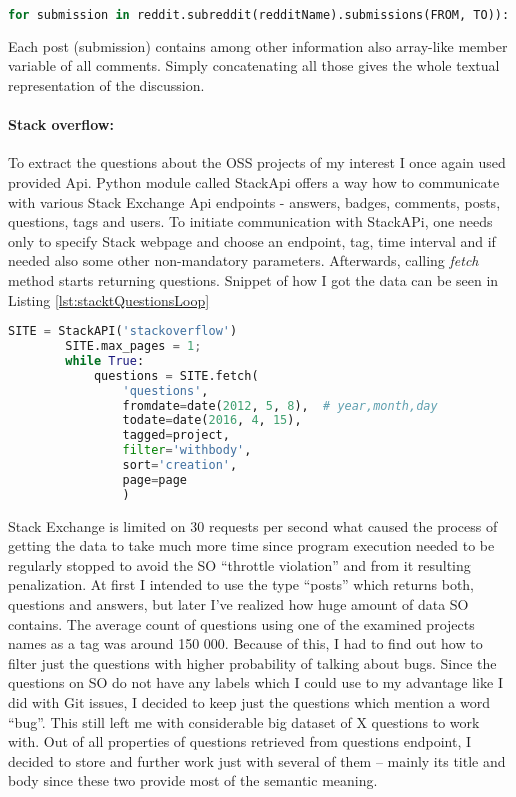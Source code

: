 \begin{lstlisting}[caption={Getting posts from subreddit},label={lst:redditSubmissionsLoop},language=Python]
for submission in reddit.subreddit(redditName).submissions(FROM, TO)):
\end{lstlisting}

Each post (submission) contains among other information also array-like member variable of all comments. Simply concatenating all those gives the whole textual representation of the discussion.


\paragraph{Stack overflow:}
To extract the questions about the OSS projects of my interest I once again used provided Api. Python module called StackApi offers a way how to communicate with various Stack Exchange Api endpoints - answers, badges, comments, posts, questions, tags and users. To initiate communication with StackAPi, one needs only to specify Stack webpage and choose an endpoint, tag, time interval and if needed also some other non-mandatory parameters. Afterwards, calling \textit{fetch} method starts returning questions. Snippet of how I got the data can be seen in Listing \ref{lst:stacktQuestionsLoop}

\begin{lstlisting}[caption={Getting Stackoverflow questions with StackApi},label={lst:stacktQuestionsLoop},language=Python]
	SITE = StackAPI('stackoverflow')
    	SITE.max_pages = 1;
    	while True:
    		questions = SITE.fetch(
    			'questions',
    			fromdate=date(2012, 5, 8),  # year,month,day
        		todate=date(2016, 4, 15),
        		tagged=project,
        		filter='withbody',
        		sort='creation',
        		page=page
                )
\end{lstlisting}

Stack Exchange is limited on 30 requests per second what caused the process of getting the data to take much more time since program execution needed to be regularly stopped to avoid the SO “throttle violation” and from it resulting penalization. At first I intended to use the type “posts” which returns both, questions and answers, but later I've realized how huge amount of data SO contains.  The average count of questions using one of the examined projects names as a tag was around 150 000. Because of this, I had to find out how to filter just the questions with higher probability of talking about bugs. Since the questions on SO do not have any labels which I could use to my advantage like I did with Git issues, I decided to keep just the questions which mention a word “bug”. This still left me with considerable big dataset of X questions to work with. Out of all properties of questions retrieved from questions endpoint, I decided to store and further work just with several of them – mainly its title and body since these two provide most of the semantic meaning.